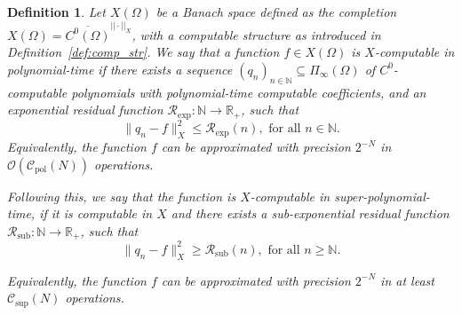 \documentclass[pdflatex]{sn-jnl}%
\newtheorem{definition}[theorem]{Definition}
\begin{document}
\begin{definition}\label{def:pol_comp}
Let $X(\Omega)$ be a Banach space defined as the completion $X(\Omega)=\overline{C^0(\Omega)}^{||\cdot||_X}$, with a computable structure as introduced in Definition~\ref{def:comp_str}. We say that a function $f\in X(\Omega)$ is \emph{$X$-computable in polynomial-time} if there exists a sequence $(q_n)_{n\in \mathbb{N}}\subseteq \Pi_\infty(\Omega)$ of  $C^0$-computable polynomials with polynomial-time computable coefficients, and an \emph{exponential} residual function  $\mathcal{R}_\mathrm{exp}:\mathbb{N}\rightarrow \mathbb{R}_+$, such that 
\begin{equation}\label{eq:conv_upper_bnd}
    \|q_n-f\|_X^2\leq \mathcal{R}_\mathrm{exp}(n),\textrm{ for all } n\in \mathbb{N}.
\end{equation}
Equivalently, the function $f$ can be approximated with precision $2^{-N}$ in $\mathcal{O}(\mathcal{C}_\mathrm{pol}(N))$ operations. 

Following this, we say that the function is $X$-computable in super-polynomial-time, if it is computable in $X$ and there exists a sub-exponential residual function $\mathcal{R}_{\mathrm{sub}}:\mathbb{N}\rightarrow\mathbb{R}_+$, such that 
\begin{equation}
 \|q_n-f\|_X^2\geq \mathcal{R}_{\mathrm{sub}}(n) ,\textrm{ for all } n\geq \mathbb{N}.
\end{equation}

Equivalently, the function $f$ can be approximated with precision $2^{-N}$ in at least $\mathcal{C}_\mathrm{sup}(N)$ operations.
\end{definition}
\end{document}
